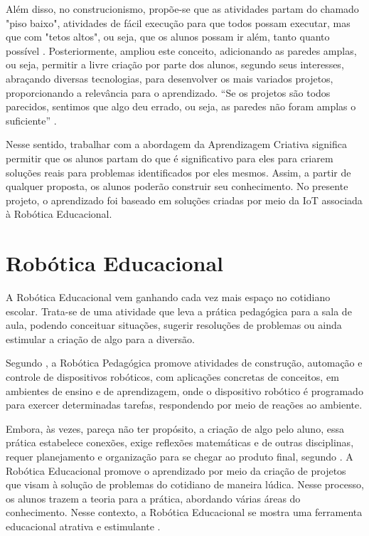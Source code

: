 \documentclass[portuguese]{textolivre}
\begin{document}
Além disso, no construcionismo, propõe-se que as atividades partam do chamado "piso baixo", atividades de fácil execução para que todos possam executar, mas que com "tetos altos", ou seja, que os alunos possam ir além, tanto quanto possível \cite {resnick,papert}. Posteriormente, \textcite {resnick} ampliou este conceito, adicionando as paredes amplas, ou seja, permitir a livre criação por parte dos alunos, segundo seus interesses, abraçando diversas tecnologias, para desenvolver os mais variados projetos, proporcionando a relevância para o aprendizado. “Se os projetos são todos parecidos, sentimos que algo deu errado, ou seja, as paredes não foram amplas o suficiente” \cite [p. 61] {resnick}. 

Nesse sentido, trabalhar com a abordagem da Aprendizagem Criativa significa permitir que os alunos partam do que é significativo para eles para criarem soluções reais para problemas identificados por eles mesmos. Assim, a partir de qualquer proposta, os alunos poderão construir seu conhecimento. No presente projeto, o aprendizado foi baseado em soluções criadas por meio da IoT associada à Robótica Educacional.

\section{Robótica Educacional}\label{sec-normas}

A Robótica Educacional vem ganhando cada vez mais espaço no cotidiano escolar. Trata-se de uma atividade que leva a prática pedagógica para a sala de aula, podendo conceituar situações, sugerir resoluções de problemas ou ainda estimular a criação de algo para a diversão.  

Segundo \textcite{valente}, a Robótica Pedagógica promove atividades de construção, automação e controle de dispositivos robóticos, com aplicações concretas de conceitos, em ambientes de ensino e de aprendizagem, onde o dispositivo robótico é programado para exercer determinadas tarefas, respondendo por meio de reações ao ambiente.

Embora, às vezes, pareça não ter propósito, a criação de algo pelo aluno, essa prática estabelece conexões, exige reflexões matemáticas e de outras disciplinas, requer planejamento e organização para se chegar ao produto final, segundo \textcite {fiorio,teixeira}. A Robótica Educacional promove o aprendizado por meio da criação de projetos que visam à solução de problemas do cotidiano de maneira lúdica. Nesse processo, os alunos trazem a teoria para a prática, abordando várias áreas do conhecimento. Nesse contexto, a Robótica Educacional se mostra uma ferramenta educacional atrativa e estimulante \cite{osorio}. 
\end{document}
